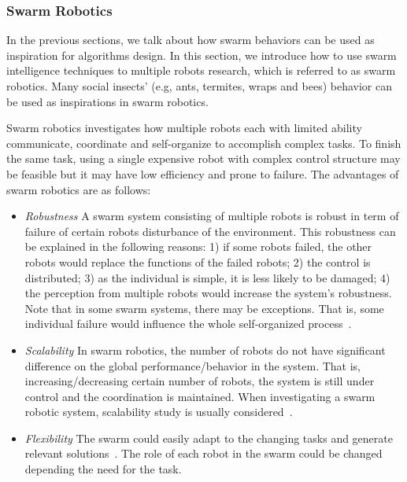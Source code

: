 \subsubsection{Swarm Robotics}

In the previous sections, we talk about how swarm behaviors can be used as inspiration for algorithms design. In this section, we introduce how to use swarm intelligence techniques to multiple robots research, which is referred to as swarm robotics. Many social insects' (e.g, ants, termites, wraps and bees) behavior can be used as inspirations in swarm robotics. 

Swarm robotics investigates how multiple robots each with limited ability communicate, coordinate and self-organize to accomplish complex tasks. To finish the same task, using a single expensive robot with complex control structure may be feasible but it may have low efficiency and prone to failure. The advantages of swarm robotics are as follows: 

\begin{itemize}

\item \textit{Robustness} A swarm system consisting of multiple robots is robust in term of failure of certain robots disturbance of the environment. This robustness can be explained in the following reasons: 1) if some robots failed, the other robots would replace the functions of the failed robots; 2) the control is distributed; 3) as the individual is simple, it is less likely to be damaged; 4) the perception from multiple robots would increase the system's robustness. Note that in some swarm systems, there may be exceptions. That is, some individual failure would influence the whole self-organized process~\cite{Bjerknes2013}.

\item \textit{Scalability} In swarm robotics, the number of robots do not have significant difference on the global performance/behavior in the system. That is, increasing/decreasing certain number of robots, the system is still under control and the coordination is maintained. When investigating a swarm robotic system, scalability study is usually considered~\cite{Jianing:TRO:2015, Melvin_DARS2014}.

\item \textit{Flexibility} The swarm could easily adapt to the changing tasks and generate relevant solutions~\cite{Sahin:LNCS:2005}. The role of each robot in the swarm could be changed depending the need for the task. 
\end{itemize}

